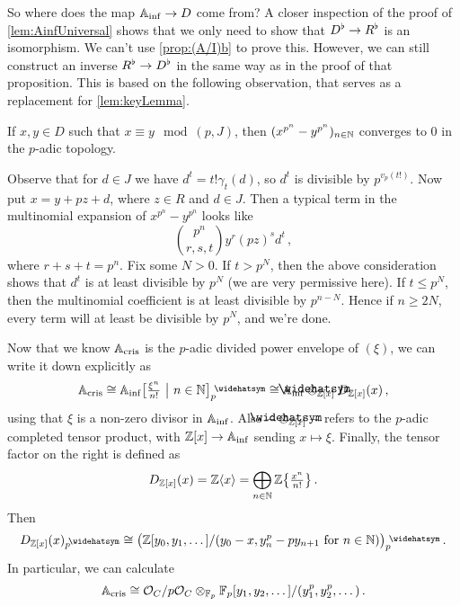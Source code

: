 So where does the map $\IA_\inf\morphism D$ come from? A closer inspection of the proof of \cref{lem:AinfUniversal} shows that we only need to show that $D^\flat\morphism R^\flat$ is an isomorphism. We can't use \cref{prop:(A/I)b} to prove this. However, we can still construct an inverse $R^\flat\morphism D^\flat$ in the same way as in the proof of that proposition. This is based on the following observation, that serves as a replacement for \cref{lem:keyLemma}.
\begin{lem*}
	If $x,y\in D$ such that $x\equiv y\mod (p,J)$, then $(x^{p^n}-y^{p^n})_{n\in\mathbb{N}}$ converges to $0$ in the $p$-adic topology.
\end{lem*}
\begin{proof*}
	Observe that for $d\in J$ we have $d^t=t!\gamma_t(d)$, so $d^t$ is divisible by $p^{v_p(t!)}$. Now put $x=y+pz+d$, where $z\in R$ and $d\in J$. Then a typical term in the multinomial expansion of $x^{p^n}-y^{p^n}$ looks like
	\begin{equation*}
		\binom{p^n}{r,s,t}y^r(pz)^sd^t\,,
	\end{equation*}
	where $r+s+t=p^n$. Fix some $N>0$. If $t>p^N$, then the above consideration shows that $d^t$ is at least divisible by $p^N$ (we are very permissive here). If $t\leq p^N$, then the multinomial coefficient is at least divisible by $p^{n-N}$. Hence if $n\geq 2N$, every term will at least be divisible by $p^N$, and we're done.
\end{proof*}
Now that we know $\mathbb{A}_{\mathrm{cris}}$ is the $p$-adic divided power envelope of $(\xi)$, we can write it down explicitly as
\begin{equation*}
	\IA_\cris\cong \IA_\inf\big[\textstyle\frac{\xi^n}{n!}\ \big|\  n\in\IN\big]_p^\complete\cong \IA_\inf\cotimes_{\IZ[x]}D_{\IZ[x]}(x)\,,
\end{equation*}
using that $\xi$ is a non-zero divisor in $\mathbb{A}_{\mathrm{inf}}$. Also $-\cotimes_{\IZ[x]}-$ refers to the $p$-adic completed tensor product, with $\IZ[x]\morphism\IA_\inf$ sending $x\mapsto \xi$. Finally, the tensor factor on the right is defined as
\begin{equation*}
	D_{\mathbb{Z}[x]}(x)=\mathbb{Z}\langle x\rangle =\bigoplus_{n\in\mathbb{N}}\mathbb{Z}\big\{\textstyle\frac{x^n}{n!}\big\}\,.
\end{equation*}
Then
\begin{equation*}
	D_{\IZ[x]}(x)_p^\complete\cong\big(\IZ[y_0,y_1,\dotsc]/(y_0-x,y_n^p-py_{n+1} \text{ for }n\in\IN)\big)_p^\complete\,.
\end{equation*}
In particular, we can calculate
\begin{equation*}
	\mathbb{A}_{\mathrm{cris}}\cong \mathcal{O}_C/p\mathcal{O}_C\otimes_{\mathbb{F}_p}\mathbb{F}_p[y_1,y_2,\dotsc]/(y_1^p,y_2^p,\dotsc)\,.
\end{equation*}
